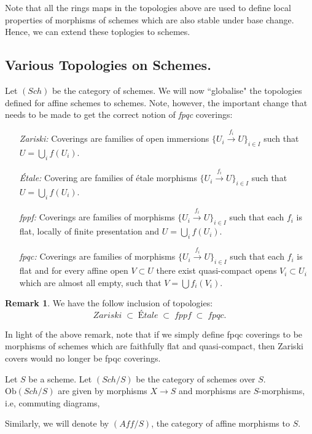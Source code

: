 \documentclass[11pt]{amsart}
\newcommand{\Ob}{\text{Ob}}
\theoremstyle{definition}
\newtheorem{remark}[theorem]{Remark}
\begin{document}
Note that all the rings maps in the topologies above are used to define local properties of morphisms of schemes which are also stable under base change. Hence, we can extend these toplogies to schemes.

\subsection{Various Topologies on Schemes.}
Let $(\mathit{Sch})$ be the category of schemes. We will now ``globalise" the topologies defined for affine schemes to schemes. Note, however, the important change that needs to be made to get the correct notion of \textit{fpqc} coverings:


\begin{enumerate}
	\item[\textit{Zariski:}]  Coverings are families of open immersions $\{ U_i \overset{f_i}{\to} U\}_{i \in I}$ such that $U= \bigcup_i f(U_i)$.
	\item[\textit{\'{E}tale:}] Covering are families of \'{e}tale morphisms $\{ U_i \overset{f_i}{\to} U\}_{i \in I}$ such that $U= \bigcup_i f(U_i)$.
	\item[\textit{fppf:}] Coverings are families of morphisms $\{ U_i \overset{f_i}{\to} U\}_{i \in I}$ such that each $f_i$ is flat, locally of finite presentation and $U= \bigcup_i f(U_i)$.
	\item[\textit{fpqc:}] Coverings are families of morphisms $\{ U_i \overset{f_i}{\to} U\}_{i \in I}$ such that each $f_i$ is flat and for every affine open $V \subset U$ there exist quasi-compact opens $V_i \subset U_i$ which are almost all empty, such that $V = \bigcup f_i(V_i)$.
\end{enumerate}


\begin{remark}
	We have the follow inclusion of topologies:
	\[\textit{Zariski}\;\subset\; \textit{\'{E}tale}\;\subset\; \textit{fppf}\;\subset\; \textit{fpqc}.\]
\end{remark}

In light of the above remark, note that if we simply define fpqc coverings to be morphisms of schemes which are faithfully flat and quasi-compact, then Zariski covers would no longer be fpqc coverings.


Let $S$ be a scheme. Let $(\mathit{Sch}/S)$ be the category of schemes over $S$. $\Ob(\mathit{Sch}/S)$ are given by morphisms $X\rightarrow S$ and morphisms are $S$-morphisms, i.e, commuting diagrams,
\begin{center}
\end{center}
Similarly, we will denote by $(\mathit{Aff}/S)$, the category of affine morphisms to $S$.\\
\end{document}
